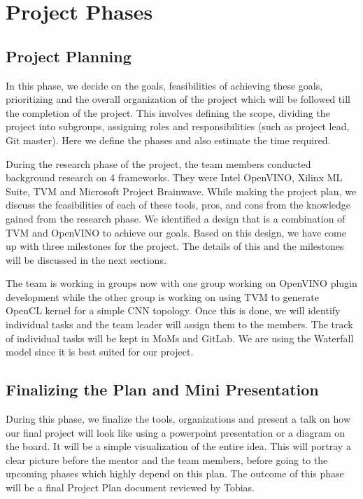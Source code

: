 \documentclass[titlepage]{report}
\begin{document}
\section{Project Phases}
\subsection{Project Planning}
In this phase, we decide on the goals, feasibilities of achieving these goals, prioritizing and the overall organization of the project which will be followed till the completion of the project. This involves defining the scope, dividing the project into subgroups, assigning roles and responsibilities (such as project lead, Git master). Here we define the phases and also estimate the time required. 

During the research phase of the project, the team members conducted background research on 4 frameworks. They were Intel OpenVINO, Xilinx ML Suite, TVM and Microsoft Project Brainwave. While making the project plan, we discuss the feasibilities of each of these tools, pros, and cons from the knowledge gained from the research phase. We identified a design that is a combination of TVM and OpenVINO to achieve our goals. Based on this design, we have come up with three milestones for the project. The details of this and the milestones will be discussed in the next sections. 

The team is working in groups now with one group working on OpenVINO plugin development while the other group is working on using TVM to generate OpenCL kernel for a simple CNN topology. Once this is done, we will identify individual tasks and the team leader will assign them to the members. The track of individual tasks will be kept in MoMs and GitLab. We are using the Waterfall model since it is best suited for our project. 


\subsection{Finalizing the Plan and Mini Presentation}
During this phase, we finalize the tools, organizations and present a talk on how our final project will look like using a powerpoint presentation or a diagram on the board. It will be a simple visualization of the entire idea. This will portray a clear picture before the mentor and the team members, before going to the upcoming phases which highly depend on this plan. The outcome of this phase will be a final Project Plan document reviewed by Tobias. 
\end{document}
